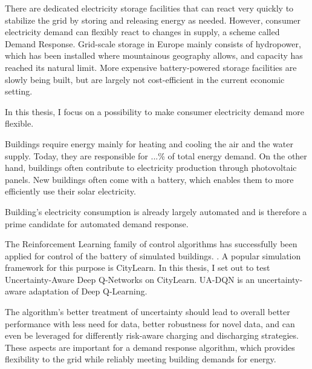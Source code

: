 There are dedicated electricity storage facilities that can react very quickly to stabilize the grid by storing and releasing energy as needed.
However, consumer electricity demand can flexibly react to changes in supply, a scheme called Demand Response.
Grid-scale storage in Europe mainly consists of hydropower, which has been installed where mountainous geography allows, and capacity has reached its natural limit.
More expensive battery-powered storage facilities are slowly being built, but are largely not cost-efficient in the current economic setting.

In this thesis, I focus on a possibility to make consumer electricity demand more flexible.

Buildings require energy mainly for heating and cooling the air and the water supply. Today, they are responsible for ...\% of total energy demand. On the other hand, buildings often contribute to electricity production through photovoltaic panels. New buildings often come with a battery, which enables them to more efficiently use their solar electricity.

Building's electricity consumption is already largely automated and is therefore a prime candidate for automated demand response.

The Reinforcement Learning family of control algorithms has successfully been applied for control of the battery of simulated buildings. . A popular simulation framework for this purpose is CityLearn.
In this thesis, I set out to test Uncertainty-Aware Deep Q-Networks  on CityLearn. UA-DQN is an uncertainty-aware adaptation of Deep Q-Learning.

The algorithm's better treatment of uncertainty should lead to overall better performance with less need for data, better robustness for novel data, and can even be leveraged for differently risk-aware charging and discharging strategies.
These aspects are important for a demand response algorithm, which provides flexibility to the grid while reliably meeting building demands for energy. 

